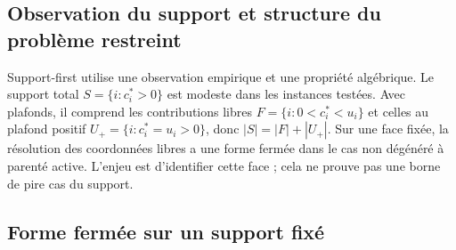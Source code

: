 \documentclass[11pt]{article}
\begin{document}
\subsection{Observation du support et structure du problème restreint}

Support-first utilise une observation empirique et une propriété algébrique. Le support total $S=\{i:c_i^*>0\}$ est modeste dans les instances testées. Avec plafonds, il comprend les contributions libres $F=\{i:0<c_i^*<u_i\}$ et celles au plafond positif $U_+=\{i:c_i^*=u_i>0\}$, donc $|S|=|F|+|U_+|$. Sur une face fixée, la résolution des coordonnées libres a une forme fermée dans le cas non dégénéré à parenté active. L'enjeu est d'identifier cette face ; cela ne prouve pas une borne de pire cas du support.

\subsection{Forme fermée sur un support fixé}
\end{document}
